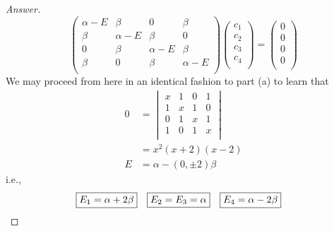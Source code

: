 \documentclass[../psets.tex]{subfiles}
\begin{document}
\begin{enumerate}
\begin{enumerate}
\begin{proof}[Answer]
            \begin{equation*}
                \begin{pmatrix}
                    \alpha-E & \beta & 0 & \beta\\
                    \beta & \alpha-E & \beta & 0\\
                    0 & \beta & \alpha-E & \beta\\
                    \beta & 0 & \beta & \alpha-E\\
                \end{pmatrix}
                \begin{pmatrix}
                    c_1\\
                    c_2\\
                    c_3\\
                    c_4\\
                \end{pmatrix}
                =
                \begin{pmatrix}
                    0\\
                    0\\
                    0\\
                    0\\
                \end{pmatrix}
            \end{equation*}
            We may proceed from here in an identical fashion to part (a) to learn that
            \begin{align*}
                0 &=
                \begin{vmatrix}
                    x & 1 & 0 & 1\\
                    1 & x & 1 & 0\\
                    0 & 1 & x & 1\\
                    1 & 0 & 1 & x\\
                \end{vmatrix}\\
                &= x^2(x+2)(x-2)\\
                E &= \alpha-(0,\pm 2)\beta
            \end{align*}
            i.e.,
            \begin{align*}
                \Aboxed{E_1 &= \alpha+2\beta}&
                \Aboxed{E_2 = E_3 &= \alpha}&
                \Aboxed{E_4 &= \alpha-2\beta}
            \end{align*}

\end{proof}
\end{enumerate}
\end{enumerate}
\end{document}
